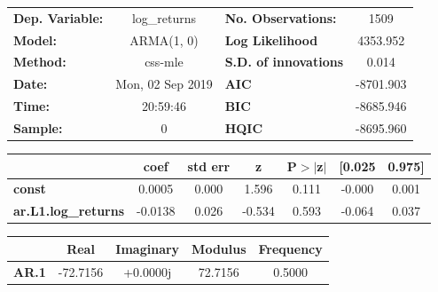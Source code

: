 \begin{center}
\begin{tabular}{lclc}
\toprule
\textbf{Dep. Variable:}     &        log\_returns       & \textbf{  No. Observations:  } &            1509            \\
\textbf{Model:}             &         ARMA(1, 0)        & \textbf{  Log Likelihood     } &          4353.952          \\
\textbf{Method:}            &          css-mle          & \textbf{  S.D. of innovations} &           0.014            \\
\textbf{Date:}              &      Mon, 02 Sep 2019     & \textbf{  AIC                } &         -8701.903          \\
\textbf{Time:}              &          20:59:46         & \textbf{  BIC                } &         -8685.946          \\
\textbf{Sample:}            &             0             & \textbf{  HQIC               } &         -8695.960          \\
\bottomrule
\end{tabular}
\begin{tabular}{lcccccc}
                            & \textbf{coef} & \textbf{std err} & \textbf{z} & \textbf{P$> |$z$|$} & \textbf{[0.025} & \textbf{0.975]}  \\
\midrule
\textbf{const}              &       0.0005  &        0.000     &     1.596  &         0.111        &       -0.000    &        0.001     \\
\textbf{ar.L1.log\_returns} &      -0.0138  &        0.026     &    -0.534  &         0.593        &       -0.064    &        0.037     \\
\bottomrule
\end{tabular}
\begin{tabular}{lcccc}
              & \textbf{            Real} & \textbf{         Imaginary} & \textbf{         Modulus} & \textbf{        Frequency}  \\
\midrule
\textbf{AR.1} &              -72.7156     &                +0.0000j     &               72.7156     &                0.5000       \\
\bottomrule
\end{tabular}
\end{center}
